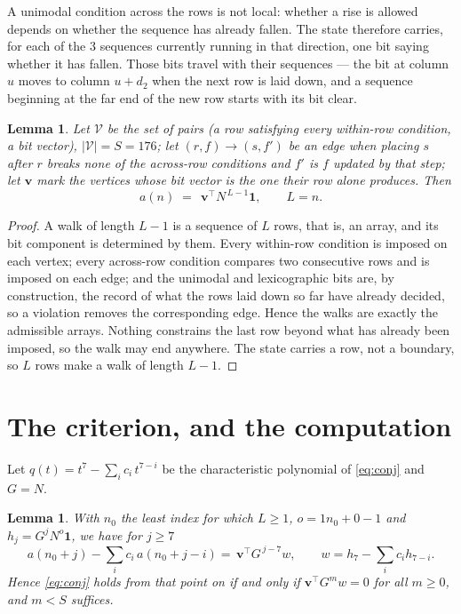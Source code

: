 \documentclass[11pt,a4paper]{article}
\theoremstyle{plain}
\newtheorem{lemma}[theorem]{Lemma}
\theoremstyle{definition}
\begin{document}
A unimodal condition across the rows is not local: whether a
rise is allowed depends on whether the sequence has already fallen. The state therefore
carries, for each of the $3$ sequences currently running in that direction, one bit saying
whether it has fallen. Those bits travel with their sequences --- the bit at column $u$
moves to column $u+d_2$ when the next row is laid down, and a sequence beginning at the
far end of the new row starts with its bit clear.

\begin{lemma}\label{lem:walk}
Let $\mathcal V$ be the set of pairs (a row satisfying every within-row condition, a
bit vector), $|\mathcal V|=S=176$; let $(r,f)\to(s,f')$ be an edge when placing $s$ after $r$
breaks none of the across-row conditions and $f'$ is $f$ updated by that step; let
$\mathbf{v}$ mark the vertices whose bit vector is the one their row alone produces.
Then
\[
a(n)\;=\;\,\mathbf{v}^{\!\top}N^{\,L-1}\mathbf{1},\qquad L=n.
\]
\end{lemma}

\begin{proof}
A walk of length $L-1$ is a sequence of $L$ rows, that is, an array, and its bit component
is determined by them. Every within-row condition is imposed on each vertex; every
across-row condition compares two consecutive rows and is imposed on each edge; and the
unimodal and lexicographic bits are, by construction, the record of what the rows laid down
so far have already decided, so a violation removes the corresponding edge. Hence the walks
are exactly the admissible arrays. Nothing constrains the last row beyond what has already
been imposed, so the walk may end anywhere. The state carries a row, not a boundary, so
$L$ rows make a walk of length $L-1$.
\end{proof}

\section{The criterion, and the computation}

Let $q(t)=t^{7}-\sum_i c_i\,t^{7-i}$ be the characteristic polynomial of
\eqref{eq:conj} and $G=N$.

\begin{lemma}\label{lem:crit}
With $n_0$ the least index for which $L\ge1$, $o=1n_0+0-1$ and
$h_j=G^{j}N^{o}\mathbf{1}$, we have for $j\ge7$
\[
a(n_0+j)-\sum_i c_i\,a(n_0+j-i)=\,\mathbf{v}^{\!\top}G^{\,j-7}w,
\qquad w=h_{7}-\sum_i c_ih_{7-i} .
\]
Hence \eqref{eq:conj} holds from that point on if and only if
$\mathbf{v}^{\!\top}G^{m}w=0$ for all $m\ge0$, and $m<S$ suffices.
\end{lemma}
\end{document}
